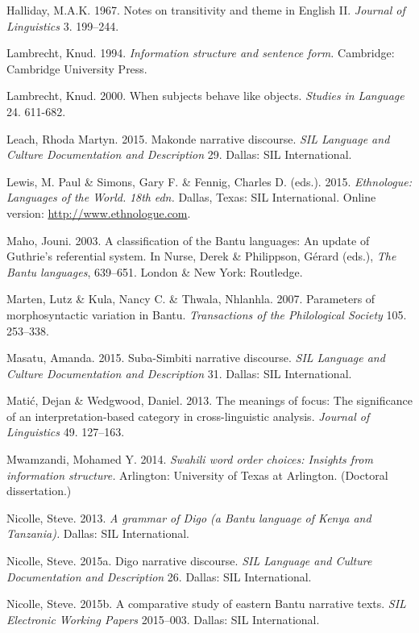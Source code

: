 \documentclass[output=paper]{langsci/langscibook}
\begin{document}
Halliday, M.A.K. 1967. Notes on transitivity and theme in English II. \textit{Journal of Linguistics} 3. 199–244.

Lambrecht, Knud. 1994. \textit{Information structure and sentence form. }Cambridge: Cambridge University Press.

Lambrecht, Knud. 2000. When subjects behave like objects. \textit{Studies }\textit{in Language} 24. 611-682.

Leach, Rhoda Martyn. 2015. Makonde narrative discourse. \textit{SIL Language and Culture Documentation and Description} 29. Dallas: SIL International.

Lewis, M. Paul \& Simons, Gary F. \& Fennig, Charles D. (eds.). 2015. \emph{Ethnologue: Languages}\emph{ of the World. }\emph{18}\emph{th}\emph{ edn. }Dallas, Texas: SIL International. Online version: \href{http://www.ethnologue.com/}{http://www.ethnologue.com}.

Maho, Jouni. 2003. A classification of the Bantu languages: An update of Guthrie’s referential system. In Nurse, Derek \& Philippson, Gérard (eds.), \textit{The Bantu languages}, 639–651. London \& New York: Routledge.

Marten, Lutz \& Kula, Nancy C. \& Thwala, Nhlanhla. 2007. Parameters of morphosyntactic variation in Bantu. \textit{Transactions of the Philological Society} 105. 253–338.

Masatu, Amanda. 2015. Suba-Simbiti narrative discourse. \textit{SIL Language and }\textit{Culture Documentation and Description} 31. Dallas: SIL International.

Matić, Dejan \& Wedgwood, Daniel. 2013. The meanings of focus: The significance of an interpretation-based category in cross-linguistic analysis. \textit{Journal of Linguistics} 49. 127–163.

Mwamzandi, Mohamed Y. 2014. \textit{Swahili word order choices: Insights from information structure.} Arlington: University of Texas at Arlington. (Doctoral dissertation.)

Nicolle, Steve. 2013. \textit{A grammar of Digo (a Bantu language of Kenya and Tanzania).} Dallas: SIL International.

Nicolle, Steve. 2015a. Digo narrative discourse. \textit{SIL Language and Culture Documentation and Description }26. Dallas: SIL International.

Nicolle, Steve. 2015b. A comparative study of eastern Bantu narrative texts. \textit{SIL Electronic Working Papers }2015–003. Dallas: SIL International.
\end{document}
